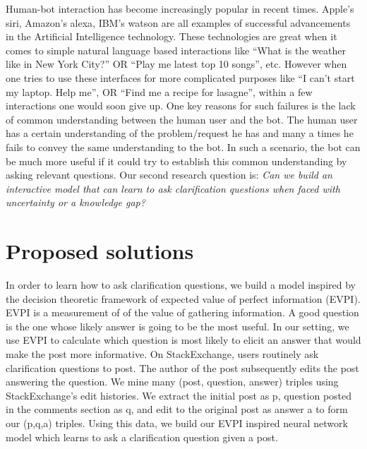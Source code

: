 \documentclass[11pt]{report}
\begin{document}
\noindent
Human-bot interaction has become increasingly popular in recent times. Apple's siri, Amazon's alexa, IBM's watson are all examples of successful advancements in the Artificial Intelligence technology. These technologies are great when it comes to simple natural language based interactions like ``What is the weather like in New York City?'' OR ``Play me latest top 10 songs'', etc. However when one tries to use these interfaces for more complicated purposes like ``I can't start my laptop. Help me\!'', OR ``Find me a recipe for lasagne'', within a few interactions one would soon give up. One key reasons for such failures is the lack of common understanding between the human user and the bot. The human user has a certain understanding of the problem/request he has and many a times he fails to convey the same understanding to the bot. In such a scenario, the bot can be much more useful if it could try to establish this common understanding by asking relevant questions. Our second research question is: \textit{Can we build an interactive model that can learn to ask clarification questions when faced with uncertainty or a knowledge gap?}\\

\noindent

\section{Proposed solutions}

In order to learn how to ask clarification questions, we build a model inspired by the decision theoretic framework of expected value of perfect information (EVPI). EVPI is a measurement of of the value of gathering information. A good question is the one whose likely answer is going to be the most useful. In our setting, we use EVPI to calculate which question is most likely to elicit an answer that would make the post more informative. On StackExchange, users routinely ask clarification questions to post. The author of the post subsequently edits the post answering the question. We mine many (post, question, answer) triples using StackExchange's edit histories. We extract the initial post as p, question posted in the comments section as q, and edit to the original post as answer a to form our (p,q,a) triples. Using this data, we build our EVPI inspired neural network model which learns to ask a clarification question given a post.\\
\end{document}
